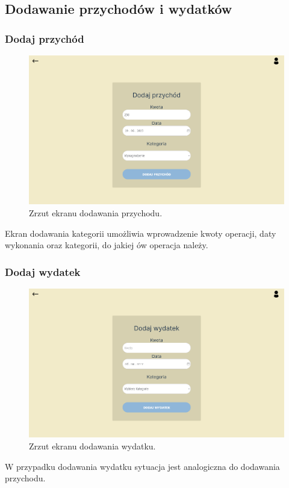 \documentclass[12pt,a4paper,oneside]{article}
\begin{document}
\subsection{Dodawanie przychodów i wydatków}
\subsubsection{Dodaj przychód}
\begin{figure}[H]
    \centering
    \includegraphics[width=\hsize,keepaspectratio]{images/add_income.png}
    \caption{Zrzut ekranu dodawania przychodu.}
\end{figure}
Ekran dodawania kategorii umożliwia wprowadzenie kwoty operacji, daty wykonania
oraz kategorii, do jakiej ów operacja należy.

\subsubsection{Dodaj wydatek}
\begin{figure}[H]
    \centering
    \includegraphics[width=\hsize,keepaspectratio]{images/add_expense.png}
    \caption{Zrzut ekranu dodawania wydatku.}
\end{figure}
W przypadku dodawania wydatku sytuacja jest analogiczna do dodawania przychodu.
\end{document}
